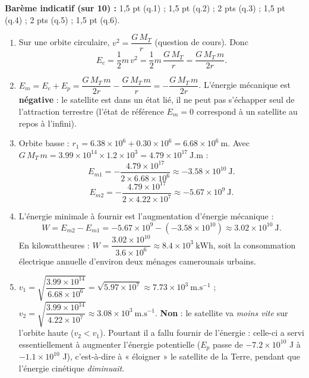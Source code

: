 \documentclass[11pt]{article}
\begin{document}
\begin{corrige}
\textbf{Barème indicatif (sur 10) :} 1,5 pt (q.1) ; 1,5 pt (q.2) ; 2 pts (q.3) ; 1,5 pt (q.4) ; 2 pts (q.5) ; 1,5 pt (q.6).

\begin{enumerate}
\item Sur une orbite circulaire, $v^2 = \dfrac{G\,M_T}{r}$ (question de cours). Donc
\[ E_c = \dfrac{1}{2}m\,v^2 = \dfrac{1}{2}m\,\dfrac{G\,M_T}{r} = \dfrac{G\,M_T\,m}{2r}. \]
\item $E_m = E_c + E_p = \dfrac{G\,M_T\,m}{2r} - \dfrac{G\,M_T\,m}{r} = -\dfrac{G\,M_T\,m}{2r}$. L'énergie mécanique est \textbf{négative} : le satellite est dans un état lié, il ne peut pas s'échapper seul de l'attraction terrestre (l'état de référence $E_m = 0$ correspond à un satellite au repos à l'infini).
\item Orbite basse : $r_1 = \num{6,38}\times 10^{6} + \num{0,30}\times 10^{6} = \num{6,68}\times 10^{6}\ \mathrm{m}$. Avec $G\,M_T\,m = \num{3,99}\times 10^{14} \times \num{1,2}\times 10^{3} = \num{4,79}\times 10^{17}\ \mathrm{J.m}$ :
\[ E_{m1} = -\dfrac{\num{4,79}\times 10^{17}}{2 \times \num{6,68}\times 10^{6}} \approx -\num{3,58}\times 10^{10}\ \mathrm{J}. \]
\[ E_{m2} = -\dfrac{\num{4,79}\times 10^{17}}{2 \times \num{4,22}\times 10^{7}} \approx -\num{5,67}\times 10^{9}\ \mathrm{J}. \]
\item L'énergie minimale à fournir est l'augmentation d'énergie mécanique :
\[ W = E_{m2} - E_{m1} = -\num{5,67}\times 10^{9} - (-\num{3,58}\times 10^{10}) \approx \num{3,02}\times 10^{10}\ \mathrm{J}. \]
En kilowattheures : $W = \dfrac{\num{3,02}\times 10^{10}}{\num{3,6}\times 10^{6}} \approx \num{8,4}\times 10^{3}\ \mathrm{kWh}$, soit la consommation électrique annuelle d'environ deux ménages camerounais urbains.
\item $v_1 = \sqrt{\dfrac{\num{3,99}\times 10^{14}}{\num{6,68}\times 10^{6}}} = \sqrt{\num{5,97}\times 10^{7}} \approx \num{7,73}\times 10^{3}\ \mathrm{m.s^{-1}}$ ;
$v_2 = \sqrt{\dfrac{\num{3,99}\times 10^{14}}{\num{4,22}\times 10^{7}}} \approx \num{3,08}\times 10^{3}\ \mathrm{m.s^{-1}}$.
\textbf{Non} : le satellite va \emph{moins vite} sur l'orbite haute ($v_2 < v_1$). Pourtant il a fallu fournir de l'énergie : celle-ci a servi essentiellement à augmenter l'énergie potentielle ($E_p$ passe de $-\num{7,2}\times 10^{10}$ J à $-\num{1,1}\times 10^{10}$ J), c'est-à-dire à « éloigner » le satellite de la Terre, pendant que l'énergie cinétique \emph{diminuait}.

\end{enumerate}
\end{corrige}
\end{document}
